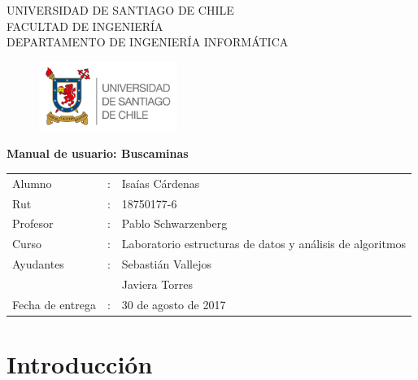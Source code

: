 \documentclass[letterpaper,12pt]{report}
\begin{document}
\renewcommand{\contentsname}{Tabla de Contenido}
\begin{titlepage}
\begin{center}
UNIVERSIDAD DE SANTIAGO DE CHILE\\
FACULTAD DE INGENIERÍA\\
DEPARTAMENTO DE INGENIERÍA INFORMÁTICA\\
\begin{figure}[htb]
\begin{center}
\includegraphics[width=4.5cm]{logo.png}
\end{center}
\end{figure}

\vspace*{0.7in}
\begin{Large}
\textbf{Manual de usuario: Buscaminas} \\
\end{Large}
\vspace*{0.3in}

\vspace*{2in}

\end{center}
\begin{flushright}

\begin{tabular}{lll}
Alumno & : & Isaías Cárdenas\\
Rut & : & 18750177-6\\
Profesor & : & Pablo Schwarzenberg\\
Curso & : & Laboratorio estructuras de datos y análisis de algoritmos\\
Ayudantes & : & Sebastián Vallejos\\
          &  & Javiera Torres\\
Fecha de entrega & : & 30 de agosto de 2017
\end{tabular}
\end{flushright}
\end{titlepage}

\tableofcontents
\listoffigures

\chapter {Introducci\'on}
\end{document}
